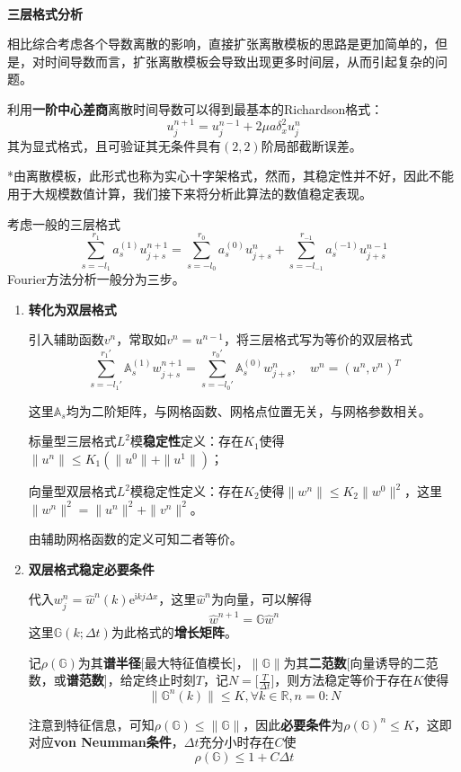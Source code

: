 \documentclass[a4paper,UTF8,fontset=windows]{ctexart}
\begin{document}
\

\textbf{三层格式分析}

相比综合考虑各个导数离散的影响，直接扩张离散模板的思路是更加简单的，但是，对时间导数而言，扩张离散模板会导致出现更多时间层，从而引起复杂的问题。

利用\textbf{一阶中心差商}离散时间导数可以得到最基本的Richardson格式：
$$u_j^{n+1}=u_j^{n-1}+2\mu a\delta_x^2u_j^n$$
其为显式格式，且可验证其无条件具有$(2,2)$阶局部截断误差。

*由离散模板，此形式也称为实心十字架格式，然而，其稳定性并不好，因此不能用于大规模数值计算，我们接下来将分析此算法的数值稳定表现。

考虑一般的三层格式
$$\sum_{s=-l_1}^{r_1}a_s^{(1)}u_{j+s}^{n+1}=\sum_{s=-l_0}^{r_0}a_s^{(0)}u_{j+s}^n+\sum_{s=-l_{-1}}^{r_{-1}}a_s^{(-1)}u_{j+s}^{n-1}$$
Fourier方法分析一般分为三步。
\begin{enumerate}
    \item \textbf{转化为双层格式}
    
    引入辅助函数$v^n$，常取如$v^n=u^{n-1}$，将三层格式写为等价的双层格式
    $$\sum_{s=-l_1'}^{r_1'}\mathbb{A}_s^{(1)}w_{j+s}^{n+1}=\sum_{s=-l_0'}^{r_0'}\mathbb{A}_s^{(0)}w_{j+s}^n,\quad w^n=(u^n,v^n)^T$$
    
    这里$\mathbb{A}_s$均为二阶矩阵，与网格函数、网格点位置无关，与网格参数相关。
    
    标量型三层格式$L^2$模\textbf{稳定性}定义：存在$K_1$使得$\|u^n\|\le K_1(\|u^0\|+\|u^1\|)$；
    
    向量型双层格式$L^2$模稳定性定义：存在$K_2$使得$\|w^n\|\le K_2\|w^0\|^2$，这里$\|w^n\|^2=\|u^n\|^2+\|v^n\|^2$。
    
    由辅助网格函数的定义可知二者等价。

    \item \textbf{双层格式稳定必要条件}
    
    代入$w_j^n=\hat{w}^n(k)\mathrm{e}^{\mathrm{i}kj\Delta x}$，这里$\hat{w}^n$为向量，可以解得
    $$\hat{w}^{n+1}=\mathbb{G}\hat{w}^n$$
    这里$\mathbb{G}(k;\Delta t)$为此格式的\textbf{增长矩阵}。

    记$\rho(\mathbb{G})$为其\textbf{谱半径}[最大特征值模长]，$\|\mathbb{G}\|$为其\textbf{二范数}[向量诱导的二范数，或\textbf{谱范数}]，给定终止时刻$T$，记$N=\big[\frac{T}{\Delta t}\big]$，则方法稳定等价于存在$K$使得
    $$\|\mathbb{G}^n(k)\|\le K,\forall k\in\mathbb{R},n=0:N$$

    注意到特征信息，可知$\rho(\mathbb{G})\le\|\mathbb{G}\|$，因此\textbf{必要条件}为$\rho(\mathbb{G})^n\le K$，这即对应\textbf{von Neumman条件}，$\Delta t$充分小时存在$C$使
    $$\rho(\mathbb{G})\le1+C\Delta t$$


\end{enumerate}
\end{document}
